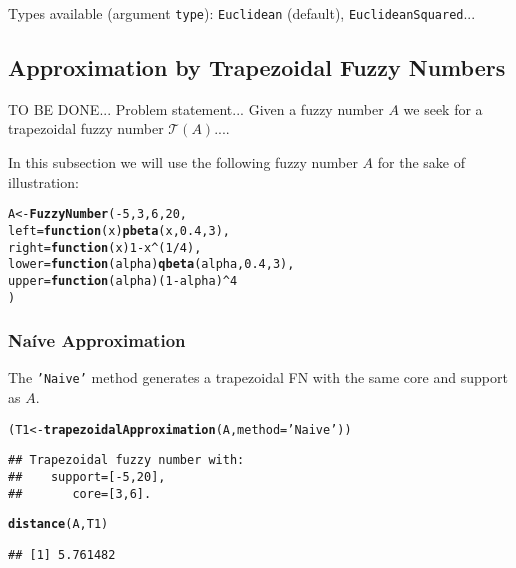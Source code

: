 \documentclass[11pt]{article}\usepackage{graphicx, color}
\makeatletter
\newcommand{\hlfunctioncall}[1]{\textcolor[rgb]{0.501960784313725,0,0.329411764705882}{\textbf{#1}}}%
\newcommand{\hlstring}[1]{\textcolor[rgb]{0.6,0.6,1}{#1}}%
\newenvironment{kframe}{%
 \def\at@end@of@kframe{}%
 \ifinner\ifhmode%
  \def\at@end@of@kframe{\end{minipage}}%
  \begin{minipage}{\columnwidth}%
 \fi\fi%
 \def\FrameCommand##1{\hskip\@totalleftmargin \hskip-\fboxsep
 \colorbox{shadecolor}{##1}\hskip-\fboxsep
     \hskip-\linewidth \hskip-\@totalleftmargin \hskip\columnwidth}%
 \MakeFramed {\advance\hsize-\width
   \@totalleftmargin\z@ \linewidth\hsize
   \@setminipage}}%
 {\par\unskip\endMakeFramed%
 \at@end@of@kframe}
\newenvironment{knitrout}{}{} %
\makeatother
\begin{document}
Types available (argument \texttt{type}): \texttt{Euclidean} (default),
\texttt{EuclideanSquared}...





\subsection{Approximation by Trapezoidal Fuzzy Numbers}

TO BE DONE... Problem statement...
%
Given a fuzzy number $A$ we seek for a trapezoidal
fuzzy number $\mathcal{T}(A)$....

In this subsection we will use the following fuzzy number $A$
for the sake of illustration:

\begin{knitrout}\small
{}\color{fgcolor}\begin{kframe}
\begin{alltt}
A <- \hlfunctioncall{FuzzyNumber}(-5, 3, 6, 20,
   left=\hlfunctioncall{function}(x) \hlfunctioncall{pbeta}(x,0.4,3),
   right=\hlfunctioncall{function}(x) 1-x^(1/4),
   lower=\hlfunctioncall{function}(alpha) \hlfunctioncall{qbeta}(alpha,0.4,3),
   upper=\hlfunctioncall{function}(alpha) (1-alpha)^4
)
\end{alltt}
\end{kframe}
\end{knitrout}



\subsubsection{Na\'{i}ve Approximation}

The \texttt{'Naive'} method generates a trapezoidal FN with the same
core and support as $A$.

\begin{knitrout}\small
{}\color{fgcolor}\begin{kframe}
\begin{alltt}
(T1 <- \hlfunctioncall{trapezoidalApproximation}(A, method=\hlstring{'Naive'}))
\end{alltt}
\begin{verbatim}
## Trapezoidal fuzzy number with:
##    support=[-5,20],
##       core=[3,6].
\end{verbatim}
\begin{alltt}
\hlfunctioncall{distance}(A, T1)
\end{alltt}
\begin{verbatim}
## [1] 5.761482
\end{verbatim}
\end{kframe}
\end{knitrout}
\end{document}
